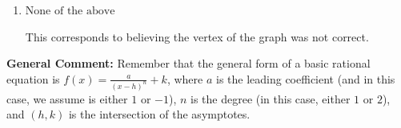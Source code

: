 \documentclass{extbook}[14pt]
\begin{document}
\begin{enumerate}
{\begin{enumerate}[label=\Alph*.]
This is the correct option.
\item \( \text{None of the above} \)

This corresponds to believing the vertex of the graph was not correct.
\end{enumerate}

\textbf{General Comment:} Remember that the general form of a basic rational equation is $ f(x) = \frac{a}{(x-h)^n} + k$, where $a$ is the leading coefficient (and in this case, we assume is either $1$ or $-1$), $n$ is the degree (in this case, either $1$ or $2$), and $(h, k)$ is the intersection of the asymptotes.
}
\end{enumerate}
\end{document}
